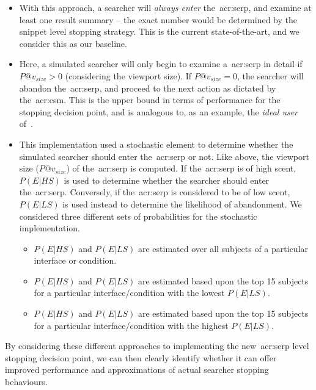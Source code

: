 \begin{itemize}
    \item{ With this approach, a searcher will \emph{always enter} the~\gls{acr:serp}, and examine at least one result summary -- the exact number would be determined by the snippet level stopping strategy. This is the current state-of-the-art, and we consider this as our baseline.}
    \item{ Here, a simulated searcher will only begin to examine a~\gls{acr:serp} in detail if $P@v_{size} > 0$ (considering the viewport size). If $P@v_{size} = 0$, the searcher will abandon the~\gls{acr:serp}, and proceed to the next action as dictated by the~\gls{acr:csm}. This is the upper bound in terms of performance for the stopping decision point, and is analogous to, as an example, the \emph{ideal user} of~\cite{hagen2016simulating_users}.}
    \item{ This implementation used a stochastic element to determine whether the simulated searcher should enter the~\gls{acr:serp} or not. Like above, the viewport size ($P@v_{size}$) of the~\gls{acr:serp} is computed. If the~\gls{acr:serp} is of high scent, $P(E|HS)$ is used to determine whether the searcher should enter the~\gls{acr:serp}. Conversely, if the~\gls{acr:serp} is considered to be of low scent, $P(E|LS)$ is used instead to determine the likelihood of abandonment. We considered three different sets of probabilities for the stochastic implementation.}
    
    \begin{itemize}
        \item{ $P(E|HS)$ and $P(E|LS)$ are estimated over all subjects of a particular interface or condition.}
        \item{ $P(E|HS)$ and $P(E|LS)$ are estimated based upon the top 15 subjects for a particular interface/condition with the lowest $P(E|LS)$.}
        \item{ $P(E|HS)$ and $P(E|LS)$ are estimated based upon the top 15 subjects for a particular interface/condition with the highest $P(E|LS)$.}
    \end{itemize}
\end{itemize}

By considering these different approaches to implementing the new~\gls{acr:serp} level stopping decision point, we can then clearly identify whether it can offer improved performance and approximations of actual searcher stopping behaviours. 

